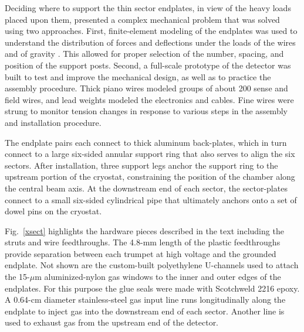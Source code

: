 Deciding where to support the thin sector endplates, in view of the heavy
loads placed upon them, presented a complex mechanical problem that was
solved using two approaches.  First, finite-element modeling of the endplates
was used to understand the distribution of forces and deflections under the
loads of the wires and of gravity \cite{ansys}.  This allowed for proper
selection of the number, spacing, and position of the support posts.  Second, 
a full-scale prototype of the detector was built to test and improve the 
mechanical design, as well as to practice the assembly procedure.  Thick piano 
wires modeled groups of about 200 sense and field wires, and lead weights 
modeled the electronics and cables.  Fine wires were strung to monitor tension
changes in response to various steps in the assembly and installation procedure.

The endplate pairs each connect to thick aluminum back-plates, which in turn
connect to a large six-sided annular support ring that also serves to align
the six sectors.  After installation, three support legs anchor the support ring 
to the upstream portion of the cryostat, constraining the position of the chamber 
along the central beam axis.  At the downstream end of each sector, the 
sector-plates connect to a small six-sided cylindrical pipe that ultimately anchors 
onto a set of dowel pins on the cryostat.

Fig.~\ref{xsect} highlights the hardware pieces described in the text including 
the struts and wire feedthroughs.  The 4.8-mm length of the plastic feedthroughs 
provide separation between each trumpet at high voltage and the grounded endplate.  
Not shown are the custom-built polyethylene U-channels used to attach the 15-$\mu$m 
aluminized-nylon gas windows to the inner and outer edges of the endplates.  For
this purpose the glue seals were made with Scotchweld 2216 epoxy.  A 0.64-cm 
diameter stainless-steel gas input line runs longitudinally along the endplate 
to inject gas into the downstream end of each sector.  Another line is used to 
exhaust gas from the upstream end of the detector. 

